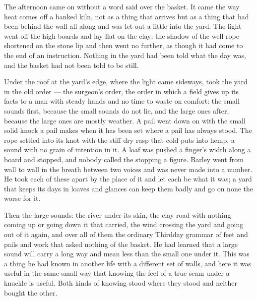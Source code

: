 The afternoon came on without a word said over the basket. It came the way heat comes off a banked kiln, not as a thing that arrives but as a thing that had been behind the wall all along and was let out a little into the yard. The light went off the high boards and lay flat on the clay; the shadow of the well rope shortened on the stone lip and then went no further, as though it had come to the end of an instruction. Nothing in the yard had been told what the day was, and the basket had not been told to be still.

Under the roof at the yard's edge, where the light came sideways,  took the yard in the old order --- the surgeon's order, the order in which a field gives up its facts to a man with steady hands and no time to waste on comfort: the small sounds first, because the small sounds do not lie, and the large ones after, because the large ones are mostly weather. A pail went down on  with the small solid knock a pail makes when it has been set where a pail has always stood. The rope settled into its knot with the stiff dry rasp that cold puts into hemp, a sound with no grain of intention in it. A loaf was pushed a finger's width along a board and stopped, and nobody called the stopping a figure. Barley went from wall to wall in the breath between two voices and was never made into a number. He took each of these apart by the place of it and let each be what it was; a yard that keeps its days in loaves and glances can keep them badly and go on none the worse for it.

Then the large sounds: the river under its skin, the clay road with nothing coming up or going down it that carried, the wind crossing the yard and going out of it again, and over all of them the ordinary Thirdday grammar of feet and pails and work that asked nothing of the basket. He had learned that a large sound will carry a long way and mean less than the small one under it. This was a thing he had known in another life with a different set of walls, and here it was useful in the same small way that knowing the feel of a true seam under a knuckle is useful. Both kinds of knowing stood where they stood and neither bought the other.

